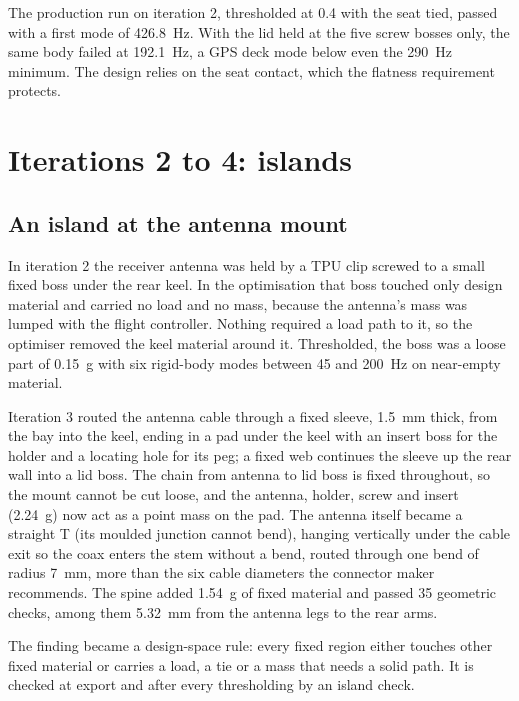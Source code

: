 The production run on iteration 2, thresholded at 0.4 with the seat tied, passed with a first mode of \SI{426.8}{Hz}. With the lid held at the five screw bosses only, the same body failed at \SI{192.1}{Hz}, a GPS deck mode below even the \SI{290}{Hz} minimum. The design relies on the seat contact, which the flatness requirement protects.

\section{Iterations 2 to 4: islands}\label{sec:iter-islands}

\subsection{An island at the antenna mount}

In iteration 2 the receiver antenna was held by a TPU clip screwed to a small fixed boss under the rear keel. In the optimisation that boss touched only design material and carried no load and no mass, because the antenna's mass was lumped with the flight controller. Nothing required a load path to it, so the optimiser removed the keel material around it. Thresholded, the boss was a loose part of \SI{0.15}{g} with six rigid-body modes between 45 and \SI{200}{Hz} on near-empty material.

Iteration 3 routed the antenna cable through a fixed sleeve, \SI{1.5}{mm} thick, from the bay into the keel, ending in a pad under the keel with an insert boss for the holder and a locating hole for its peg; a fixed web continues the sleeve up the rear wall into a lid boss. The chain from antenna to lid boss is fixed throughout, so the mount cannot be cut loose, and the antenna, holder, screw and insert (\SI{2.24}{g}) now act as a point mass on the pad. The antenna itself became a straight T (its moulded junction cannot bend), hanging vertically under the cable exit so the coax enters the stem without a bend, routed through one bend of radius \SI{7}{mm}, more than the six cable diameters the connector maker recommends. The spine added \SI{1.54}{g} of fixed material and passed 35 geometric checks, among them \SI{5.32}{mm} from the antenna legs to the rear arms.

The finding became a design-space rule: every fixed region either touches other fixed material or carries a load, a tie or a mass that needs a solid path. It is checked at export and after every thresholding by an island check.

